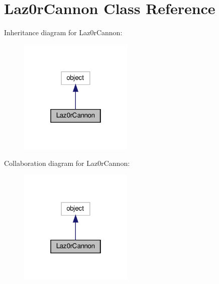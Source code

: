 \hypertarget{classpewpewlaz0rt4nk_1_1_laz0r_cannon}{}\section{Laz0r\+Cannon Class Reference}
\label{classpewpewlaz0rt4nk_1_1_laz0r_cannon}


Inheritance diagram for Laz0r\+Cannon\+:
\nopagebreak
\begin{figure}[H]
\begin{center}
\leavevmode
\includegraphics[width=154pt]{classpewpewlaz0rt4nk_1_1_laz0r_cannon__inherit__graph}
\end{center}
\end{figure}


Collaboration diagram for Laz0r\+Cannon\+:
\nopagebreak
\begin{figure}[H]
\begin{center}
\leavevmode
\includegraphics[width=154pt]{classpewpewlaz0rt4nk_1_1_laz0r_cannon__coll__graph}
\end{center}
\end{figure}

